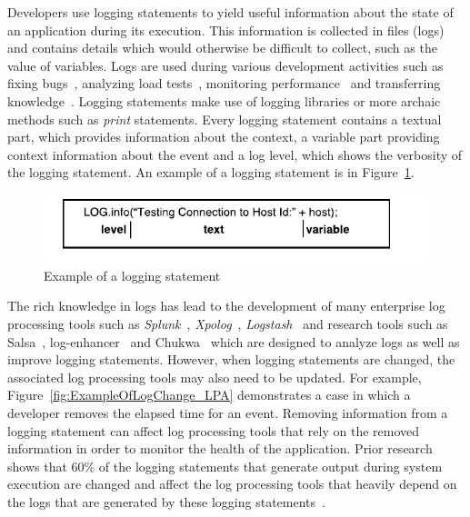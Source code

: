 

Developers use logging statements to yield useful information about the state of an application during its execution. This information is collected in files (logs) and contains details  which would otherwise be difficult to collect, such as the value of variables. Logs are used during various development activities such as fixing bugs~\cite{ConsoleLogs,JGLouMining,QFuanomaly}, analyzing load tests~\cite{Automatic}, monitoring performance~\cite{Yuan} and transferring knowledge~\cite{IanWCRE}.
Logging statements make use of logging libraries or more archaic methods such as \textsl{print} statements. Every logging statement contains a textual part, which provides information about the context, a variable part providing context information about the event and a log level, which shows the verbosity of the logging statement. An example of a logging statement is in Figure~\ref{fig:logexample}.

\begin{figure}[tb!]
	\centering
	\includegraphics[width=1\columnwidth]{logexample}
	\caption{Example of a logging statement}
	\label{fig:logexample}
\end{figure}




The rich knowledge in logs has lead to the development of many enterprise log processing tools such as \textsl{Splunk}~\cite{carasso2012exploring}, \textsl{Xpolog}~\cite{xpolog}, \textsl{Logstash}~\cite{xu2013detecting} and research tools such as Salsa~\cite{TanSalsa}, log-enhancer~\cite{Yuan} and Chukwa~\cite{chukwa} which are designed to analyze logs as well as improve logging statements. However, when logging statements are changed, the associated log processing tools may also need to be updated. For example, Figure~\ref{fig:ExampleOfLogChange_LPA} demonstrates a case in which a developer removes the elapsed time for an event. Removing information from a logging statement can affect log processing tools that rely on the removed information in order to monitor the health of the application. Prior research shows that 60\% of the logging statements that generate output during system execution are changed and affect the log processing tools that heavily depend on the logs that are generated by these logging statements~\cite{IanWCRE}.

